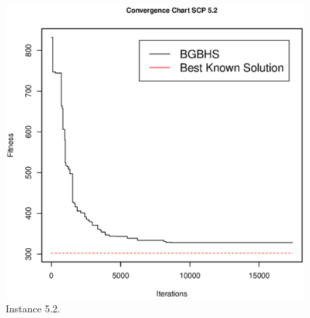 
\begin{figure}[]
\centering
\includegraphics[scale=.45]{Resultados/scp52.eps}
\caption{Instance 5.2.}
\label{fig:Instance.5.2}
\end{figure}

